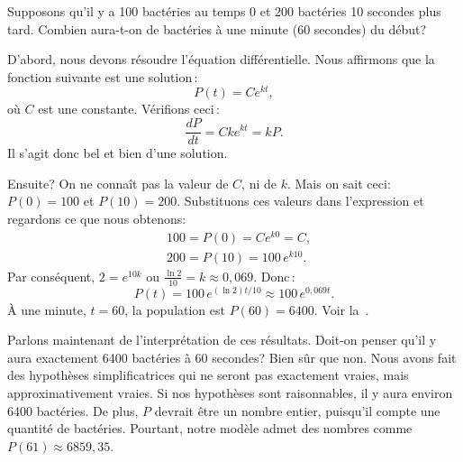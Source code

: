 \begin{example}
Supposons qu'il y a 100 bact\'eries au temps 0 et 200 bact\'eries 10 secondes plus tard.  Combien aura-t-on de bact\'eries \`a une minute (60 secondes) du d\'ebut?

%
%
D'abord, nous devons r\'esoudre l'\'equation diff\'erentielle.  Nous affirmons que la fonction suivante est une solution\,: 
\begin{equation*}
P(t) = C e^{kt}, 
\end{equation*}
o\`u $C$ est une constante.  V\'erifions ceci\,: 
\begin{equation*}
\frac{dP}{dt} = C k e^{kt} = k P .
\end{equation*}
Il s'agit donc bel et bien d'une solution.

Ensuite?  On ne connaît pas la valeur de $C$, ni de $k$.  Mais on sait ceci: $P(0) = 100$ et $P(10) = 200$.  
Substituons ces valeurs dans l'expression et regardons ce que nous obtenons: 
\begin{align*}
& 100 = P(0) = C e^{k0} = C ,\\
& 200 = P(10) = 100 \, e^{k10} .
\end{align*}
Par cons\'equent, $2 = e^{10k}$ ou $\frac{\ln 2}{10} = k \approx 0,069$.
Donc\,: 
\begin{equation*}
P(t) = 100 \, e^{(\ln 2) t / 10} \approx 100 \, e^{0,069 t} .
\end{equation*}
\`A une minute, $t=60$, la population est $P(60) = 6400$.  
Voir la~.
%
\begin{myfig}
\capstart
{}
\caption{Croissance de bact\'eries en 60 secondes.\label{intro:plotbactfig}}
\end{myfig}



Parlons maintenant de l'interpr\'etation de ces r\'esultats.  Doit-on penser qu'il y aura exactement 6400 bact\'eries \`a 60 secondes? Bien s\^ur que non.  Nous avons fait des hypoth\`eses simplificatrices qui ne seront pas exactement vraies, mais approximativement vraies.  Si nos hypoth\`eses sont raisonnables, il y aura environ 6400 bact\'eries.  De plus, $P$ devrait \^etre un nombre entier, puisqu'il compte une quantit\'e de bact\'eries.  Pourtant, notre mod\`ele admet des nombres comme $P(61) \approx 6859,35$.
\end{example}


